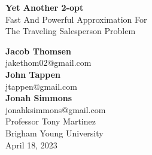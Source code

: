 \documentclass[12pt]{report}
\begin{document}
\begin{titlepage}
    \begin{center}
        \vspace*{1cm}
        \Huge
        \textbf{Yet Another 2-opt} \\

        \vspace{0.5cm}
        \large
        Fast And Powerful Approximation For \\
        The Traveling Salesperson Problem
            
        \vspace{1.5cm}

        \textbf{Jacob Thomsen} \\
        jakethom02@gmail.com \\
        \vspace{0.5cm}
        \textbf{John Tappen} \\
        jtappen@gmail.com \\
        \vspace{0.5cm}
        \textbf{Jonah Simmons} \\
        jonahksimmons@gmail.com \\

        \vfill
        Professor Tony Martinez \\
        Brigham Young University \\
        April 18, 2023
        \normalsize
    \end{center}
\end{titlepage}
\end{document}
